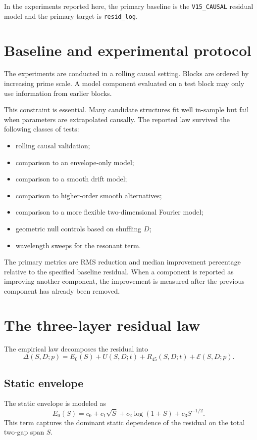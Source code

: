 \documentclass[11pt]{article}
\begin{document}
In the experiments reported here, the primary baseline is the \texttt{V15\_CAUSAL} residual model and the primary target is \texttt{resid\_log}.

\section{Baseline and experimental protocol}

The experiments are conducted in a rolling causal setting. Blocks are ordered by increasing prime scale. A model component evaluated on a test block may only use information from earlier blocks.

This constraint is essential. Many candidate structures fit well in-sample but fail when parameters are extrapolated causally. The reported law survived the following classes of tests:
\begin{itemize}
\item rolling causal validation;
\item comparison to an envelope-only model;
\item comparison to a smooth drift model;
\item comparison to higher-order smooth alternatives;
\item comparison to a more flexible two-dimensional Fourier model;
\item geometric null controls based on shuffling \(D\);
\item wavelength sweeps for the resonant term.
\end{itemize}

The primary metrics are RMS reduction and median improvement percentage relative to the specified baseline residual. When a component is reported as improving another component, the improvement is measured after the previous component has already been removed.

\section{The three-layer residual law}

The empirical law decomposes the residual into
\[
\Delta(S,D;p)=E_0(S)+U(S,D;t)+R_{45}(S,D;t)+\mathcal{E}(S,D;p).
\]

\subsection{Static envelope}

The static envelope is modeled as
\[
E_0(S)=c_0+c_1\sqrt S+c_2\log(1+S)+c_3S^{-1/2}.
\]
This term captures the dominant static dependence of the residual on the total two-gap span \(S\).
\end{document}
